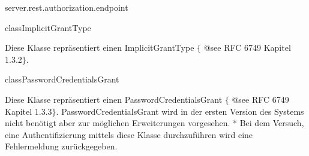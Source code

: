 \begin{texdocpackage}{server.rest.authorization.endpoint}
\begin{texdocclass}{class}{ImplicitGrantType}
\label{texdoclet:edu.kit.informatik.studyplan.server.rest.authorization.endpoint.ImplicitGrantType}
\begin{texdocclassintro}
Diese Klasse repräsentiert einen ImplicitGrantType $\{$ @see RFC 6749 Kapitel 1.3.2$\}$.\end{texdocclassintro}
\begin{texdocclassconstructors}
\end{texdocclassconstructors}
\begin{texdocclassmethods}
\end{texdocclassmethods}
\end{texdocclass}



\begin{texdocclass}{class}{PasswordCredentialsGrant}
\label{texdoclet:edu.kit.informatik.studyplan.server.rest.authorization.endpoint.PasswordCredentialsGrant}
\begin{texdocclassintro}
Diese Klasse repräsentiert einen PasswordCredentialsGrant  $\{$ @see RFC 6749 Kapitel 1.3.3$\}$.
 PasswordCredentialsGrant wird in der ersten Version des Systems nicht benötigt aber zur möglichen 
 Erweiterungen vorgesehen.
  * Bei dem Versuch, eine Authentifizierung mittels diese Klasse durchzuführen wird eine Fehlermeldung
 zurückgegeben.\end{texdocclassintro}
\begin{texdocclassconstructors}
\end{texdocclassconstructors}
\begin{texdocclassmethods}
\end{texdocclassmethods}
\end{texdocclass}



\end{texdocpackage}
